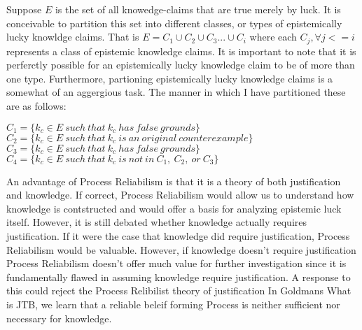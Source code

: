 \documentclass{article}
\begin{document}

Suppose $E$ is the set of all knowedge-claims that are true merely by luck.
It is conceivable to partition this set into different classes, or types
of epistemically lucky knowldge claims. That is $E = C_{1} \cup C_{2} \cup
C_{3} ... \cup C_{i}$ where each $C_{j}, \forall j <= i$ represents a class
of epistemic knowledge claims. It is important to note that it is perferctly
possible for an epistemically lucky knowledge claim to be of more than one type.
Furthermore, partioning epistemically lucky knowledge claims is a somewhat of an
aggergious task. The manner in which I have partitioned these are as follows:
\begin{displayquote}
$ C_{1} = \{ k_{c} \in E \ such \ that \ k_{c} \ has \ false \ grounds \} $ \\
$ C_{2} = \{ k_{c} \in E \ such \ that \ k_{c} \ is \ an \ original \ counterexample \} $ \\
$ C_{3} = \{ k_{c} \in E \ such \ that \ k_{c} \ has \ false \ grounds \} $ \\
$ C_{4} = \{ k_{c} \in E \ such \ that \ k_{c} \ is \ not \ in \ C_{1}, \ C_{2},
\ or \ C_{3}  \} $ \\
\end{displayquote}


An advantage of Process Reliabilism is that it is a theory of both
justification and knowledge. If correct, Process Reliabilism would
allow us to understand how knowledge is contstructed and would
offer a basis for analyzing epistemic luck itself. %
However, it is still debated whether knowledge actually requires justification.
If it were the case that knowledge did require justification, Process Reliabilism
would be valuable. However, if knowledge doesn't require justification
Process Reliabilism doesn't offer much value for further investigation
since it is fundamentally flawed in assuming knowledge require justification.
A response to this could reject the Process Relibilist theory of justification
In Goldmans What is JTB, we learn that a reliable beleif forming Process
is neither sufficient nor necessary for knowledge.

\end{document}
